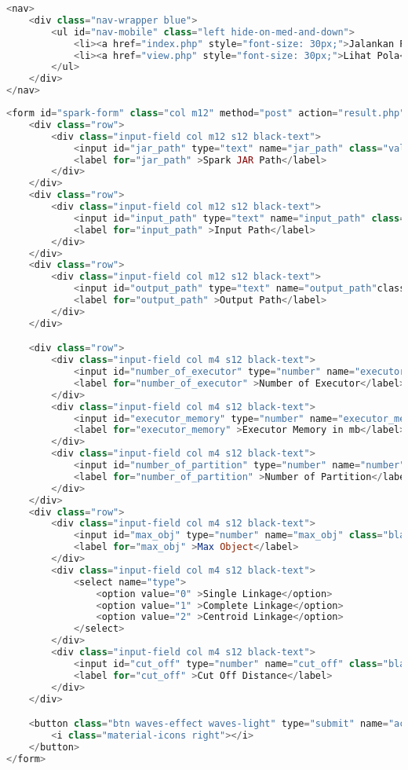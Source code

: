 \begin{lstlisting}[language=PHP, caption=nav.php]
<nav>
    <div class="nav-wrapper blue">
      	<ul id="nav-mobile" class="left hide-on-med-and-down">
	        <li><a href="index.php" style="font-size: 30px;">Jalankan Program</a></li>
	        <li><a href="view.php" style="font-size: 30px;">Lihat Pola</a></li>
      	</ul>
    </div>
</nav>
\end{lstlisting}

\begin{lstlisting}[language=PHP, caption=form.php]
<form id="spark-form" class="col m12" method="post" action="result.php" style="font-size: 20px;">
	<div class="row">
		<div class="input-field col m12 s12 black-text">
			<input id="jar_path" type="text" name="jar_path" class="validate">
			<label for="jar_path" >Spark JAR Path</label>
		</div>
	</div>
	<div class="row">
		<div class="input-field col m12 s12 black-text">
			<input id="input_path" type="text" name="input_path" class="black-text">
			<label for="input_path" >Input Path</label>
		</div>
	</div>
	<div class="row">
		<div class="input-field col m12 s12 black-text">
			<input id="output_path" type="text" name="output_path"class="black-text">
			<label for="output_path" >Output Path</label>
		</div>
	</div>

	<div class="row">
		<div class="input-field col m4 s12 black-text">
			<input id="number_of_executor" type="number" name="executor_number" class="black-text" value="1" min="1" step="1" max="100">
			<label for="number_of_executor" >Number of Executor</label>
		</div>
		<div class="input-field col m4 s12 black-text">
			<input id="executor_memory" type="number" name="executor_memory" class="black-text" value="1000" min="1000" step="100">
			<label for="executor_memory" >Executor Memory in mb</label>
		</div>
		<div class="input-field col m4 s12 black-text">
			<input id="number_of_partition" type="number" name="number" class="black-text" value="1" min="1" step="1" max="200">
			<label for="number_of_partition" >Number of Partition</label>
		</div>
	</div>
	<div class="row">
		<div class="input-field col m4 s12 black-text">
			<input id="max_obj" type="number" name="max_obj" class="black-text" value="1" min="1" step="1" max="100">
			<label for="max_obj" >Max Object</label>
		</div>
		<div class="input-field col m4 s12 black-text">
			<select name="type">
				<option value="0" >Single Linkage</option>
				<option value="1" >Complete Linkage</option>
				<option value="2" >Centroid Linkage</option>
			</select>
		</div>
		<div class="input-field col m4 s12 black-text">
			<input id="cut_off" type="number" name="cut_off" class="black-text" value="0.1" min="0.1" step="0.1" max="1">
			<label for="cut_off" >Cut Off Distance</label>
		</div>
	</div>

	<button class="btn waves-effect waves-light" type="submit" name="action">Submit
		<i class="material-icons right"></i>
	</button>
</form>
\end{lstlisting}

